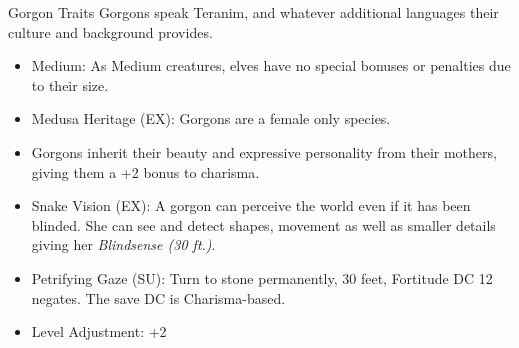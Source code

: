 \begin{35e}{Gorgon Traits}
  Gorgons speak Teranim, and whatever additional languages their culture and
  background provides.

  \begin{itemize}[noitemsep]
    \item Medium: As Medium creatures, elves have no special bonuses or
      penalties due to their size.
    \item Medusa Heritage (EX): Gorgons are a female only species.
    \item Gorgons inherit their beauty and expressive personality from their
      mothers, giving them a +2 bonus to charisma.
    \item Snake Vision (EX): A gorgon can perceive the world even if it has
      been blinded. She can see and detect shapes, movement as well as smaller
      details giving her \emph{Blindsense (30 ft.)}.
    \item Petrifying Gaze (SU): Turn to stone permanently, 30 feet, Fortitude
      DC 12 negates. The save DC is Charisma-based.
    \item Level Adjustment: +2
  \end{itemize}
\end{35e}
